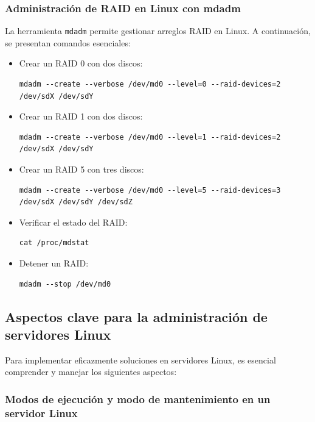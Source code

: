 \subsubsection{Administración de RAID en Linux con mdadm}

La herramienta \texttt{mdadm} permite gestionar arreglos RAID en Linux. A continuación, se presentan comandos esenciales:

\begin{itemize}
  \item Crear un RAID 0 con dos discos:
    \begin{lstlisting}[style=mystyle]
    mdadm --create --verbose /dev/md0 --level=0 --raid-devices=2 /dev/sdX /dev/sdY
    \end{lstlisting}
  \item Crear un RAID 1 con dos discos:
    \begin{lstlisting}[style=mystyle]
    mdadm --create --verbose /dev/md0 --level=1 --raid-devices=2 /dev/sdX /dev/sdY
    \end{lstlisting}
  \item Crear un RAID 5 con tres discos:
    \begin{lstlisting}[style=mystyle]
    mdadm --create --verbose /dev/md0 --level=5 --raid-devices=3 /dev/sdX /dev/sdY /dev/sdZ
    \end{lstlisting}
  \item Verificar el estado del RAID:
    \begin{lstlisting}[style=mystyle]
    cat /proc/mdstat
    \end{lstlisting}
  \item Detener un RAID:
    \begin{lstlisting}[style=mystyle]
    mdadm --stop /dev/md0
    \end{lstlisting}
\end{itemize}

\subsection{Aspectos clave para la administración de servidores Linux}

Para implementar eficazmente soluciones en servidores Linux, es esencial comprender y manejar los siguientes aspectos:

\subsubsection{Modos de ejecución y modo de mantenimiento en un servidor Linux}

